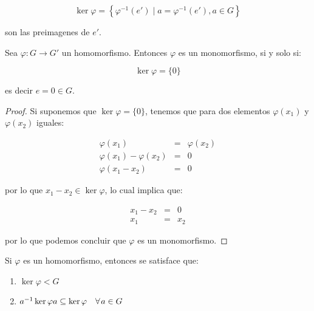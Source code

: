         \begin{observacion}
            \begin{equation}
                \ker{\varphi} = \left\{ \varphi^{-1}(e') \mid a = \varphi^{-1}(e'), a \in G \right\}
            \end{equation}

            son las preimagenes de $e'$.
        \end{observacion}

        \begin{proposicion}
            Sea $\varphi \colon G \to G'$ un homomorfismo. Entonces $\varphi$ es un monomorfismo, si y solo si:

            \begin{equation}
                \ker{\varphi} = \{0\}
            \end{equation}

            es decir $e = 0 \in G$.
        \end{proposicion}

        \begin{proof}
            Si suponemos que $\ker{\varphi} = \{0\}$, tenemos que para dos elementos $\varphi(x_1)$ y $\varphi(x_2)$ iguales:

            \begin{eqnarray*}
                \varphi(x_1) & = & \varphi(x_2) \\
                \varphi(x_1) - \varphi(x_2) & = & 0 \\
                \varphi(x_1 - x_2) & = & 0
            \end{eqnarray*}

            por lo que $x_1 - x_2 \in \ker{\varphi}$, lo cual implica que:

            \begin{eqnarray*}
                x_1 - x_2 & = & 0 \\
                x_1 & =  & x_2
            \end{eqnarray*}

            por lo que podemos concluir que $\varphi$ es un monomorfismo.
        \end{proof}

        \begin{teorema}
            Si $\varphi$ es un homomorfismo, entonces se satisface que:

            \begin{enumerate}
                \item $\ker{\varphi} < G$
                \item $a^{-1} \ker{\varphi} a \subseteq \ker{\varphi} \quad \forall \mkern2mu a \in G$
            \end{enumerate}
        \end{teorema}

